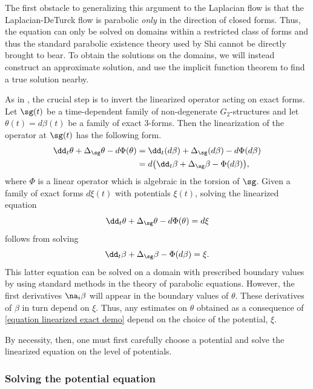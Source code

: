 \documentclass[hidelinks, 12pt, oneside, reqno]{amsart}
\begin{document}
The first obstacle to generalizing this argument to the Laplacian flow is that the Laplacian-DeTurck flow is parabolic \textit{only} in the direction of closed forms. Thus, the equation can only be solved on domains within a restricted class of forms and thus the standard parabolic existence theory used by Shi cannot be directly brought to bear. To obtain the solutions on the domains, we will instead construct an approximate solution, and use the implicit function theorem to find a true solution nearby. 

As in \cite{BryantXu}, the crucial step is to invert the linearized operator acting on exact forms. Let $\sg(t)$ be a time-dependent family of non-degenerate $G_2$-structures and let $\theta(t) = d\beta(t)$ be a family of exact 3-forms. Then the linearization of the operator at $\sg(t)$ has the following form.
\begin{align*}
    \dd_t \theta + \Delta_{\sg} \theta - d\Phi(\theta) &= \dd_t (d \beta) + \Delta_{\sg} (d\beta) - d\Phi(d\beta) \\
    &= d \big( \dd_t  \beta + \Delta_{\sg} \beta - \Phi(d\beta) \big),
\end{align*}
where $\Phi$ is a linear operator which is algebraic in the torsion of $\sg$. Given a family of exact forms $d\xi(t)$ with potentials $\xi(t)$, solving the linearized equation
\begin{equation}\label{equation linearized exact demo}
\dd_t \theta + \Delta_{\sg} \theta - d\Phi(\theta) = d \xi
\end{equation}
follows from solving 
\begin{equation}
\dd_t  \beta + \Delta_{\sg} \beta - \Phi(d\beta) = \xi.
\end{equation}
This latter equation can be solved on a domain with prescribed boundary values by using standard methods in the theory of parabolic equations. However, the first derivatives $\na_i \beta$ will appear in the boundary values of $\theta$. These derivatives of $\beta$ in turn depend on $\xi$. Thus, any estimates on $\theta$ obtained as a consequence of \eqref{equation linearized exact demo} depend on the choice of the potential, $\xi$. 

By necessity, then, one must first carefully choose a potential and solve the linearized equation on the level of potentials. 

\subsubsection{Solving the potential equation}\label{subsection solving potential}
\end{document}
